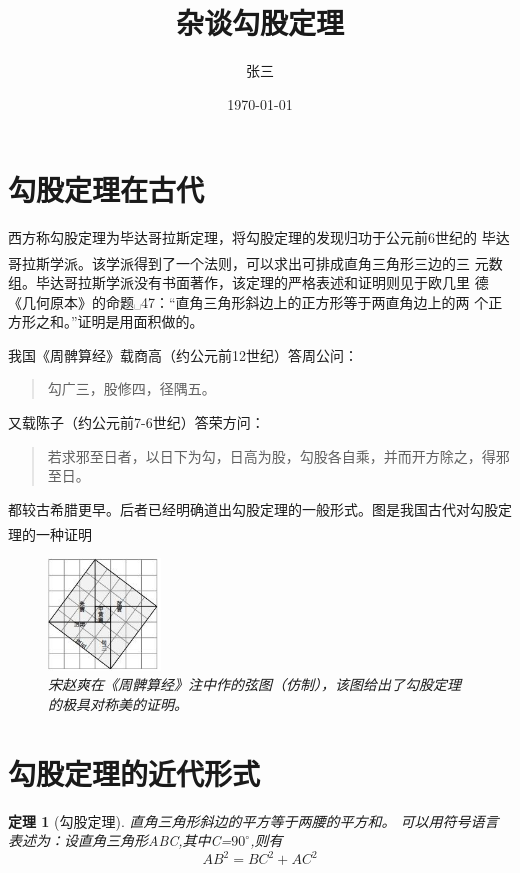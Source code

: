 \documentclass[UTF8]{ctexart}
\title{杂谈勾股定理}
\author{张三}
\date{\today}
\newcommand{\upcite}[1]{\textsuperscript{\textsuperscript{\cite{#1}}}}
\newtheorem{thm}{定理}
\begin{document}
\maketitle
\tableofcontents
\section{勾股定理在古代}

西方称勾股定理为毕达哥拉斯定理，将勾股定理的发现归功于公元前6世纪的
毕达哥拉斯学派\upcite{Kline}。该学派得到了一个法则，可以求出可排成直角三角形三边的三
元数组。毕达哥拉斯学派没有书面著作，该定理的严格表述和证明则见于欧几里
德《几何原本》的命题␣47：“直角三角形斜边上的正方形等于两直角边上的两
个正方形之和。”证明是用面积做的。

\par
我国《周髀算经》载商高（约公元前12世纪）答周公问：
\begin{quote}
    \kaishu 勾广三，股修四，径隅五。
\end{quote}
又载陈子（约公元前7-6世纪）答荣方问：
\begin{quote}
    \kaishu 若求邪至日者，以日下为勾，日高为股，勾股各自乘，并而开方除之，得邪至日。
\end{quote}
都较古希腊更早。后者已经明确道出勾股定理的一般形式。图是我国古代对勾股定理的一种证明\upcite{quanjing}

\begin{figure}[ht]
    \centering
    \includegraphics[width=3cm]{xiantu.JPG}
    \caption{\small\it 宋赵爽在《周髀算经》注中作的弦图（仿制），该图给出了勾股定理的极具对称美的证明。}
    \label{fig:gougudingli}
\end{figure}

\section{勾股定理的近代形式}


\begin{thm}[勾股定理]
    直角三角形斜边的平方等于两腰的平方和。
    可以用符号语言表述为：设直角三角形ABC,其中\angle C=$90^\circ$,则有
    \begin{equation}\label{eq:gougu}
         AB^2=BC^2+AC^2
    \end{equation}
\end{thm}
\end{document}
